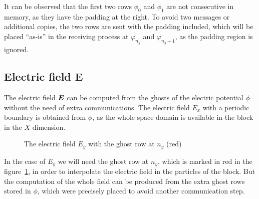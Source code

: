 It can be observed that the first two rows $\phi_0$ and $\phi_1$ are not 
consecutive in memory, as they have the padding at the right. To avoid two 
messages or additional copies, the two rows are sent with the padding included, 
which will be placed ``as-is'' in the receiving process at $\varphi_{n_y}$ and 
$\varphi_{n_y + 1}$, as the padding region is ignored.

\subsection{Electric field $\boldsymbol{E}$}

The electric field $\bm{E}$ can be computed from the ghosts of the electric 
potential $\phi$ without the need of extra communications. The electric field 
$E_x$ with a periodic boundary is obtained from $\phi$, as the whole space 
domain is available in the block in the $X$ dimension.
%
\begin{figure}[ht]
\centering
{}
\caption{The electric field $E_y$ with the ghost row at $n_y$ (red)}
\label{fig:field_Ey}
\end{figure}
%
In the case of $E_y$ we will need the ghost row at $n_y$, which is marked in red 
in the figure~\ref{fig:field_Ey}, in order to interpolate the electric field in 
the particles of the block. But the computation of the whole field can be 
produced from the extra ghost rows stored in $\phi$, which were precisely placed 
to avoid another communication step.
